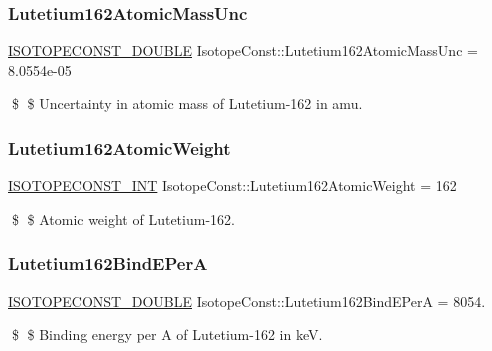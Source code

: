\subsubsection{\texorpdfstring{Lutetium162\+Atomic\+Mass\+Unc}{Lutetium162AtomicMassUnc}}
{\footnotesize\ttfamily \mbox{\hyperlink{group___isotope_const-_macros_ga8f45a7272ce02c0b4c65c44636ed719a}{I\+S\+O\+T\+O\+P\+E\+C\+O\+N\+S\+T\+\_\+\+D\+O\+U\+B\+LE}} Isotope\+Const\+::\+Lutetium162\+Atomic\+Mass\+Unc = 8.\+0554e-\/05}

\$ \$ Uncertainty in atomic mass of Lutetium-\/162 in amu. \mbox{\label{group___isotope_const-_lutetium-_lu162_gad88726ec210c116372ce3d7532c66e86}} 
\subsubsection{\texorpdfstring{Lutetium162\+Atomic\+Weight}{Lutetium162AtomicWeight}}
{\footnotesize\ttfamily \mbox{\hyperlink{group___isotope_const-_macros_ga5f18360b3e99483a35c32d789e62621c}{I\+S\+O\+T\+O\+P\+E\+C\+O\+N\+S\+T\+\_\+\+I\+NT}} Isotope\+Const\+::\+Lutetium162\+Atomic\+Weight = 162}

\$ \$ Atomic weight of Lutetium-\/162. \mbox{\label{group___isotope_const-_lutetium-_lu162_ga646b7d306238ccc01296f2ee5c9e949d}} 
\subsubsection{\texorpdfstring{Lutetium162\+Bind\+E\+PerA}{Lutetium162BindEPerA}}
{\footnotesize\ttfamily \mbox{\hyperlink{group___isotope_const-_macros_ga8f45a7272ce02c0b4c65c44636ed719a}{I\+S\+O\+T\+O\+P\+E\+C\+O\+N\+S\+T\+\_\+\+D\+O\+U\+B\+LE}} Isotope\+Const\+::\+Lutetium162\+Bind\+E\+PerA = 8054.}

\$ \$ Binding energy per A of Lutetium-\/162 in keV. \mbox{\label{group___isotope_const-_lutetium-_lu162_gaf1a33e6417152043b3dc09e54e0bc597}} 
